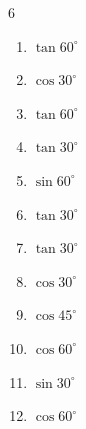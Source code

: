 \begin{multicols}{6}
\begin{enumerate}

  \item $\displaystyle \tan{60^\circ}$


  \item $\displaystyle \cos{30^\circ}$


  \item $\displaystyle \tan{60^\circ}$


\columnbreak %

  \item $\displaystyle \tan{30^\circ}$


  \item $\displaystyle \sin{60^\circ}$


  \item $\displaystyle \tan{30^\circ}$


  \item $\displaystyle \tan{30^\circ}$


  \item $\displaystyle \cos{30^\circ}$


  \item $\displaystyle \cos{45^\circ}$


  \item $\displaystyle \cos{60^\circ}$


  \item $\displaystyle \sin{30^\circ}$


  \item $\displaystyle \cos{60^\circ}$


\end{enumerate}
\end{multicols}
